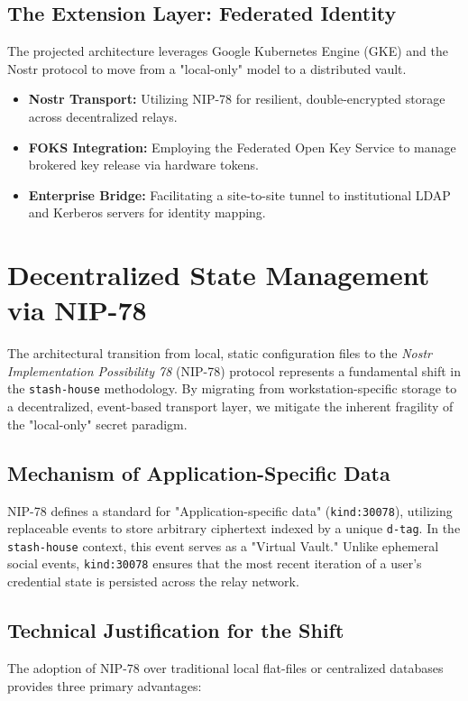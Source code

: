 \documentclass[11pt]{report}
\begin{document}
\subsection{The Extension Layer: Federated Identity}
The projected architecture leverages Google Kubernetes Engine (GKE) and the Nostr protocol to move from a "local-only" model to a distributed vault.
\begin{itemize}
	\item \textbf{Nostr Transport:} Utilizing NIP-78 for resilient, double-encrypted storage across decentralized relays.
	\item \textbf{FOKS Integration:} Employing the Federated Open Key Service to manage brokered key release via hardware tokens.
	\item \textbf{Enterprise Bridge:} Facilitating a site-to-site tunnel to institutional LDAP and Kerberos servers for identity mapping.
\end{itemize}

\section{Decentralized State Management via NIP-78}
\label{sec:nip78_shift}

The architectural transition from local, static configuration files to the \textit{Nostr Implementation Possibility 78} (NIP-78) protocol represents a fundamental shift in the \texttt{stash-house} methodology. By migrating from workstation-specific storage to a decentralized, event-based transport layer, we mitigate the inherent fragility of the "local-only" secret paradigm.

\subsection{Mechanism of Application-Specific Data}
NIP-78 defines a standard for "Application-specific data" (\texttt{kind:30078}), utilizing replaceable events to store arbitrary ciphertext indexed by a unique \texttt{d-tag}. In the \texttt{stash-house} context, this event serves as a "Virtual Vault." Unlike ephemeral social events, \texttt{kind:30078} ensures that the most recent iteration of a user's credential state is persisted across the relay network.

\subsection{Technical Justification for the Shift}
The adoption of NIP-78 over traditional local flat-files or centralized databases provides three primary advantages:
\end{document}
